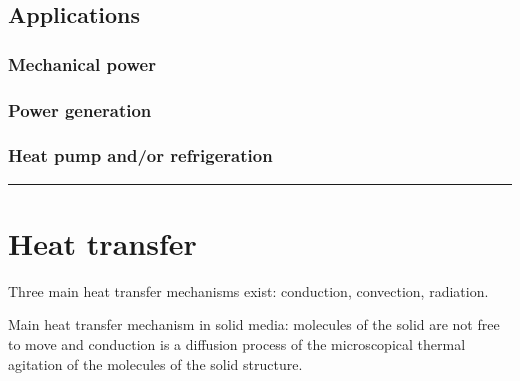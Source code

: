 \documentclass[letterpaper,10pt,english]{jupyterBook}
\begin{document}
\sphinxAtStartPar
{}

\sphinxAtStartPar
{}


\section{Applications}
\label{\detokenize{ch/heat-engines:applications}}\label{\detokenize{ch/heat-engines:classical-thermodynamics-heat-engines-systems}}

\subsection{Mechanical power}
\label{\detokenize{ch/heat-engines:mechanical-power}}\label{\detokenize{ch/heat-engines:classical-thermodynamics-heat-engines-systems-engine}}

\subsection{Power generation}
\label{\detokenize{ch/heat-engines:power-generation}}\label{\detokenize{ch/heat-engines:classical-thermodynamics-heat-engines-systems-power-generation}}

\subsection{Heat pump and/or refrigeration}
\label{\detokenize{ch/heat-engines:heat-pump-and-or-refrigeration}}\label{\detokenize{ch/heat-engines:classical-thermodynamics-heat-engines-systems-heat-pump-refrigeration}}



\bigskip\hrule\bigskip


\sphinxstepscope




\chapter{Heat transfer}
\label{\detokenize{ch/heat-transfer:heat-transfer}}\label{\detokenize{ch/heat-transfer:classical-thermodynamics-heat-transmission}}\label{\detokenize{ch/heat-transfer::doc}}
\sphinxAtStartPar
Three main heat transfer mechanisms exist: conduction, convection, radiation.

\sphinxAtStartPar
{} Main heat transfer mechanism in solid media: molecules of the solid are not free to move and conduction is a diffusion process of the microscopical thermal agitation of the molecules of the solid structure.
\end{document}
